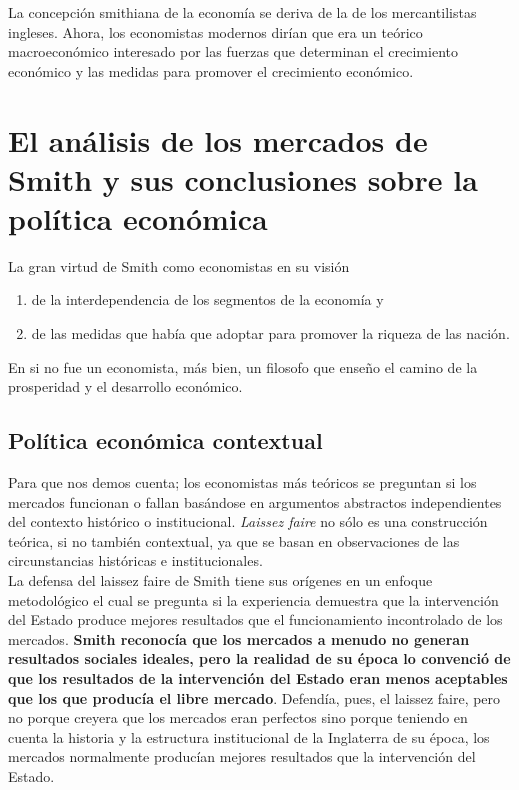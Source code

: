 \documentclass[10pt]{book}
\begin{document}
La concepción smithiana de la economía se deriva de la de los mercantilistas ingleses. Ahora, los economistas modernos dirían que era un teórico macroeconómico interesado por las fuerzas que determinan el crecimiento económico y las medidas para promover el crecimiento económico.\\


\section{El análisis de los mercados de Smith y sus conclusiones sobre la política económica}
La gran virtud de Smith como economistas en su visión
\begin{enumerate}[(1)]
    \item de la interdependencia de los segmentos de la economía y
    \item de las medidas que había que adoptar para promover la riqueza de las nación.
\end{enumerate}

En si no fue un economista, más bien, un filosofo que enseño el camino de la prosperidad y el desarrollo económico.

\subsection{Política económica contextual}
Para que nos demos cuenta; los economistas más teóricos se preguntan si los mercados funcionan o fallan basándose en argumentos abstractos independientes del contexto histórico o institucional. \textit{Laissez faire} no sólo es una construcción teórica, si no también contextual, ya que se basan en observaciones de las circunstancias históricas e institucionales.\\
La defensa del laissez faire de Smith tiene sus orígenes en un enfoque metodológico el cual se pregunta si la experiencia demuestra que la intervención del Estado produce mejores resultados que el funcionamiento incontrolado de los mercados. \textbf{Smith reconocía que los mercados a menudo no generan resultados sociales ideales, pero la realidad de su época lo convenció de que los resultados de la intervención del Estado eran menos aceptables que los que producía el libre mercado}. Defendía, pues, el laissez faire, pero no porque creyera que los mercados eran perfectos sino porque teniendo en cuenta la historia y la estructura institucional de la Inglaterra de su época, los mercados normalmente producían mejores resultados que la intervención del Estado.\\
\end{document}
